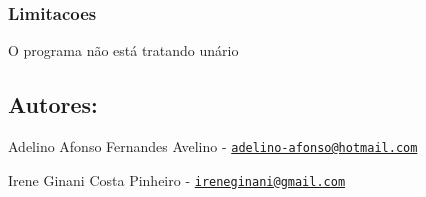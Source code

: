 \subsubsection*{Limitacoes}


\begin{DoxyItemize}
\item O programa não está tratando unário
\end{DoxyItemize}

\subsection*{Autores\+:}


\begin{DoxyItemize}
\item Adelino Afonso Fernandes Avelino -\/ \href{mailto:adelino-afonso@hotmail.com}{\tt adelino-\/afonso@hotmail.\+com}
\item Irene Ginani Costa Pinheiro -\/ \href{mailto:ireneginani@gmail.com}{\tt ireneginani@gmail.\+com} 
\end{DoxyItemize}